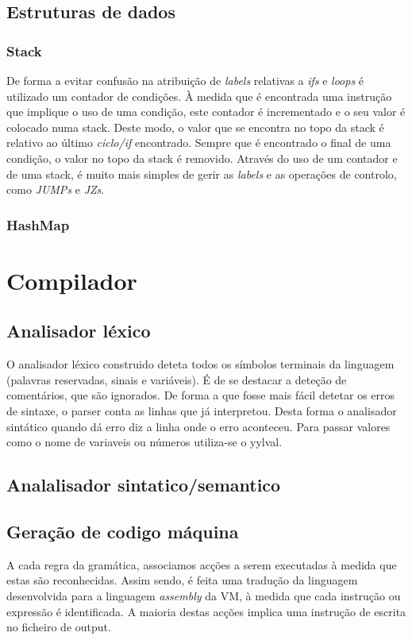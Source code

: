 \documentclass[a4paper,10pt]{report}
\begin{document}
\section{Estruturas de dados}

\subsection{Stack}
      De forma a evitar confusão na atribuição de \emph{labels} relativas a \emph{ifs} e \emph{loops} é utilizado um contador de condições. À medida que é encontrada uma instrução que implique o uso de uma condição, este contador é incrementado e o seu valor é colocado numa stack. Deste modo, o valor que se encontra no topo da stack é relativo ao último \emph{ciclo/if} encontrado. Sempre que é encontrado o final de uma condição, o valor no topo da stack é removido. Através do uso de um contador e de uma stack, é muito mais simples de gerir as \emph{labels} e as operações de controlo, como \emph{JUMPs} e \emph{JZs}.

\subsection{HashMap}



\chapter{Compilador}


\section{Analisador léxico}
  O analisador léxico construido deteta todos os símbolos terminais da linguagem (palavras reservadas, sinais e variáveis).
  É de se destacar a deteção de comentários, que são ignorados.
  De forma a que fosse mais fácil detetar os erros de sintaxe, o parser conta as linhas que já interpretou. Desta forma o analisador sintático quando dá erro diz a linha onde o erro aconteceu.  
  Para passar valores como o nome de variaveis ou números utiliza-se o yylval.


\section{Analalisador sintatico/semantico}

\section{Geração de codigo máquina}
    A cada regra da gramática, associamos acções a serem executadas à medida que estas são reconhecidas. Assim sendo, é feita uma tradução da linguagem desenvolvida para a linguagem \emph{assembly} da VM, à medida que cada instrução ou expressão é identificada. A maioria destas acções implica uma instrução de escrita no ficheiro de output. 
\end{document}
